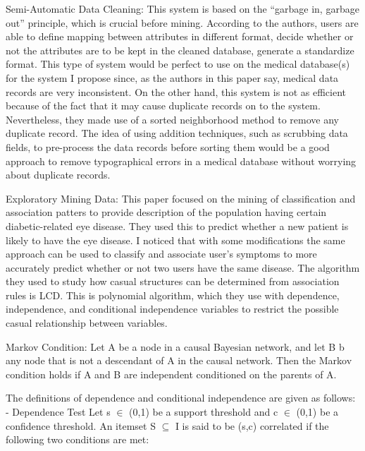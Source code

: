 \documentclass{sig-alternate}
\begin{document}
	Semi-Automatic Data Cleaning:\newline
	This system is based on the “garbage in, garbage out” principle, which  is crucial before mining.  According to the authors, users are able to define mapping between attributes in different format, decide whether or not the attributes are to be kept in the cleaned database, generate a standardize format. This type of system would be perfect to use on the medical database(s) for the system I propose since, as the authors in this paper say, medical data records are very inconsistent. On the other hand,  this system is not as efficient because of the fact that it may cause duplicate records on to the system. Nevertheless, they made use of a sorted neighborhood method to remove any duplicate record. The idea of using addition techniques, such as scrubbing data fields, to pre-process the data records before sorting them would be a good approach to remove typographical errors in a medical database without worrying about duplicate records.\newline

	Exploratory Mining Data:\newline
	This paper focused on the mining of classification and association patters to provide description of the population having certain diabetic-related eye disease. They used this to predict whether a new patient is likely to have the eye disease. I noticed that with some modifications the same approach can be used to classify and associate user's symptoms to more accurately predict whether or not two users have the same disease. The algorithm they used to study how casual structures can be determined from association rules is LCD. This is polynomial algorithm, which they use with dependence, independence, and conditional independence variables to restrict the possible casual relationship between variables.\newline

Markov Condition:\newline
Let A be a node in a causal Bayesian network, and let B b any node that is not a descendant of A in the causal network. Then the Markov condition holds if A and B are independent conditioned on the parents of A. \newline

The definitions of dependence and conditional independence are given as follows:\newline
- Dependence Test\newline
Let s $\in$ (0,1) be a support threshold and c $\in$ (0,1) be a confidence threshold. An itemset S $\subseteq$ I is said to be (s,c) correlated if the following two conditions are met:\newline
\end{document}
